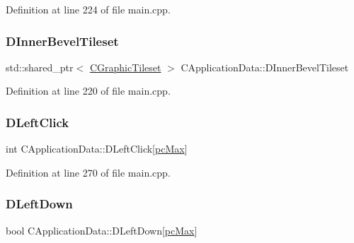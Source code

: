 Definition at line 224 of file main.\+cpp.

\hypertarget{classCApplicationData_ae62d58d93397422437d8f50acfca23e6}{}\label{classCApplicationData_ae62d58d93397422437d8f50acfca23e6} 
\subsubsection{\texorpdfstring{D\+Inner\+Bevel\+Tileset}{DInnerBevelTileset}}
{\footnotesize\ttfamily std\+::shared\+\_\+ptr$<$ \hyperlink{classCGraphicTileset}{C\+Graphic\+Tileset} $>$ C\+Application\+Data\+::\+D\+Inner\+Bevel\+Tileset\hspace{0.3cm}{\ttfamily [protected]}}



Definition at line 220 of file main.\+cpp.

\hypertarget{classCApplicationData_a8a86bb4c7cba7b119121401dda4ca68b}{}\label{classCApplicationData_a8a86bb4c7cba7b119121401dda4ca68b} 
\subsubsection{\texorpdfstring{D\+Left\+Click}{DLeftClick}}
{\footnotesize\ttfamily int C\+Application\+Data\+::\+D\+Left\+Click\mbox{[}\hyperlink{GameDataTypes_8h_aafb0ca75933357ff28a6d7efbdd7602fa594a5c8dd3987f24e8a0f23f1a72cd34}{pc\+Max}\mbox{]}\hspace{0.3cm}{\ttfamily [protected]}}



Definition at line 270 of file main.\+cpp.

\hypertarget{classCApplicationData_a2b943f18557c3e4c8cd4550e22e028b6}{}\label{classCApplicationData_a2b943f18557c3e4c8cd4550e22e028b6} 
\subsubsection{\texorpdfstring{D\+Left\+Down}{DLeftDown}}
{\footnotesize\ttfamily bool C\+Application\+Data\+::\+D\+Left\+Down\mbox{[}\hyperlink{GameDataTypes_8h_aafb0ca75933357ff28a6d7efbdd7602fa594a5c8dd3987f24e8a0f23f1a72cd34}{pc\+Max}\mbox{]}\hspace{0.3cm}{\ttfamily [protected]}}



